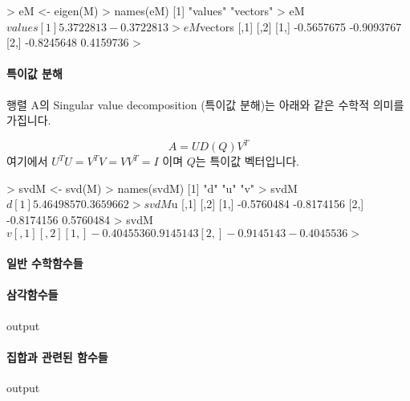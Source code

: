 \begin{Schunk}
\begin{Soutput}
> eM <- eigen(M)
> names(eM)
[1] "values"  "vectors"
> eM$values
[1]  5.3722813 -0.3722813
> eM$vectors
           [,1]       [,2]
[1,] -0.5657675 -0.9093767
[2,] -0.8245648  0.4159736
> 
\end{Soutput}
\end{Schunk}

\paragraph{특이값 분해}

행렬 A의 Singular value decomposition (특이값 분해)는 아래와 같은 수학적 의미를 가집니다. 

\begin{equation}
A = U D(Q) V^T
\end{equation}
%
여기에서 $ U^T U = V^T V = VV^T = I $ 이며 $Q$는 특이값 벡터입니다. 

\begin{Schunk}
\begin{Soutput}
> svdM <- svd(M)
> names(svdM)
[1] "d" "u" "v"
> svdM$d
[1] 5.4649857 0.3659662
> svdM$u
           [,1]       [,2]
[1,] -0.5760484 -0.8174156
[2,] -0.8174156  0.5760484
> svdM$v
           [,1]       [,2]
[1,] -0.4045536  0.9145143
[2,] -0.9145143 -0.4045536
> $
\end{Soutput}
\end{Schunk}


\paragraph{일반 수학함수들}

\paragraph{삼각함수들}
\begin{Schunk}
\begin{Soutput}
output
\end{Soutput}
\end{Schunk}
\paragraph{집합과 관련된 함수들}
\begin{Schunk}
\begin{Soutput}
output
\end{Soutput}
\end{Schunk}
